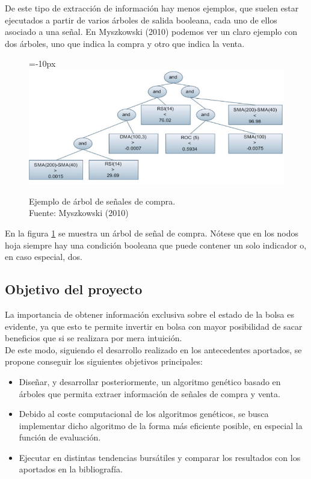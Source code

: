      De este tipo de extracci\'on de informaci\'on hay menos ejemplos, que suelen estar ejecutados a partir de varios \'arboles de salida booleana, cada uno de ellos asociado a una se\~nal. En Myszkowski (2010) podemos ver un claro ejemplo con dos \'arboles, uno que indica la compra y otro que indica la venta.\\
     
     	\begin{figure}[H]
			\centering\leftskip=-10px
			\includegraphics[scale=0.8]{imagenes/tree_halfinfo.png}
			\caption[Ejemplo de \'arbol de señales de compra]{Ejemplo de \'arbol de señales de compra. \\Fuente: Myszkowski (2010)}
			\label{fig:tree_half_info}
		\end{figure}
		
	En la figura \ref{fig:tree_half_info} se muestra un \'arbol de se\~nal de compra. N\'otese que en los nodos hoja siempre hay una condici\'on booleana que puede contener un solo indicador o, en caso especial, dos.\\
	
	\subsection{Objetivo del proyecto}
	La importancia de obtener informaci\'on exclusiva sobre el estado de la bolsa es evidente, ya que esto te permite invertir en bolsa con mayor posibilidad de sacar beneficios que si se realizara por mera intuici\'on.\\
	
	De este modo, siguiendo el desarrollo realizado en los antecedentes aportados, se propone conseguir los siguientes objetivos principales:
	
	\begin{itemize}
	    \item Dise\~nar, y desarrollar posteriormente, un algoritmo gen\'etico basado en \'arboles que permita extraer informaci\'on de se\~nales de compra y venta.
	    \item Debido al coste computacional de los algoritmos gen\'eticos, se busca implementar dicho algoritmo de la forma m\'as eficiente posible, en especial la funci\'on de evaluaci\'on.
	    \item Ejecutar en distintas tendencias burs\'atiles y comparar los resultados con los aportados en la bibliograf\'ia.
	\end{itemize}
	
